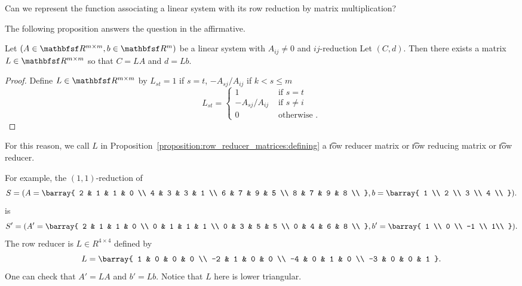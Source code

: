 

Can we represent the function associating a linear system with its row reduction by matrix multiplication?


The following proposition answers the question in the affirmative.

\begin{proposition}
  Let $(A \in \R^{m \times m}, b \in \R^{m})$ be a linear system with $A_{ij} \neq 0$ and $ij$-reduction Let $(C, d)$.
  Then there exists a matrix $L \in \R^{m \times m}$ so that $C = LA$ and  $d = Lb$.
  \begin{proof}
    Define $L \in \R^{m \times m}$ by $L_{st} = 1$ if $s = t$, $-A_{sj}/A_{ij}$ if $k < s \leq m$
    \[
      L_{st} = \begin{cases}
        1 & \text{ if } s = t \\
        -A_{sj}/A_{ij} & \text{ if } s \neq i \\
        0 & \text{ otherwise }.
      \end{cases}
    \]
  \end{proof}
  \label{proposition:row_reducer_matrices:defining}
\end{proposition}
For this reason, we call $L$ in Proposition~\ref{proposition:row_reducer_matrices:defining} a \t{row reducer matrix} or \t{row reducing matrix} or \t{row reducer}.



For example, the $(1,1)$-reduction of
\[
	S = \parens{A = \barray{
	2 & 1 & 1 & 0 \\
	4 & 3 & 3 & 1 \\
	6 & 7 & 9 & 5 \\
	8 & 7 & 9 & 8 \\
	}, b = \barray{
		1 \\
		2 \\
		3 \\
		4 \\
	}}.
\]
is
\[
	S' = \parens{A' = \barray{
	2 & 1 & 1 & 0 \\
	0 & 1 & 1 & 1 \\
	0 & 3 & 5 & 5 \\
	0 & 4 & 6 & 8 \\
	}, b' = \barray{
		1 \\
		0 \\
		-1 \\
		1\\
	}}.
\]
The row reducer is $L \in R^{4 \times 4}$ defined by
\[
  L = \barray{
    1 & 0 & 0 & 0 \\
    -2 & 1 & 0 & 0 \\
    -4 & 0 & 1 & 0 \\
    -3 & 0 & 0 & 1
  }.
\]
One can check that $A' = LA$ and $b' = Lb$.
Notice that $L$ here is lower triangular.

